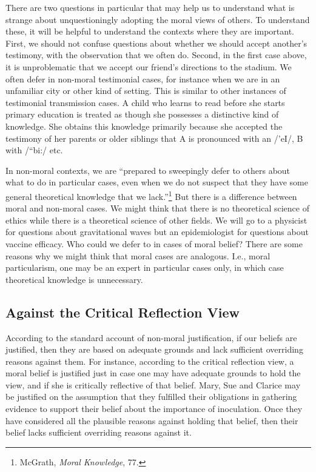 \documentclass[phdthesis,12pt,final]{wuthesis}
\theoremstyle{definition}
\theoremstyle{definition}
\theoremstyle{definition}
\theoremstyle{definition}
\theoremstyle{remark}
\begin{document}
There are two questions in particular that may help us to understand what is strange about unquestioningly adopting the moral views of others. To understand these, it will be helpful to understand the contexts where they are important. First, we should not confuse questions about whether we should accept another's testimony, with the observation that we often do. Second, in the first case above, it is unproblematic that we accept our friend's directions to the stadium. We often defer in non-moral testimonial cases, for instance when we are in an unfamiliar city or other kind of setting. This is similar to other instances of testimonial transmission cases. A child who learns to read before she starts primary education is treated as though she possesses a distinctive kind of knowledge. She obtains this knowledge primarily because she accepted the testimony of her parents or older siblings that A is pronounced with an /'eI/, B with /``bi:/ etc.

In non-moral contexts, we are ``prepared to sweepingly defer to others about what to do in particular cases, even when we do not suspect that they have some general theoretical knowledge that we lack.''\footnote{McGrath, \emph{Moral {Knowledge}}, 77.} But there is a difference between moral and non-moral cases. We might think that there is no theoretical science of ethics while there is a theoretical science of other fields. We will go to a physicist for questions about gravitational waves but an epidemiologist for questions about vaccine efficacy. Who could we defer to in cases of moral belief? There are some reasons why we might think that moral cases are analogous. I.e., moral particularism, one may be an expert in particular cases only, in which case theoretical knowledge is unnecessary.

\subsection*{Against the Critical Reflection View}\label{against-the-critical-reflection-view-1}

According to the standard account of non-moral justification, if our beliefs are justified, then they are based on adequate grounds and lack sufficient overriding reasons against them. For instance, according to the critical reflection view, a moral belief is justified just in case one may have adequate grounds to hold the view, and if she is critically reflective of that belief. Mary, Sue and Clarice may be justified on the assumption that they fulfilled their obligations in gathering evidence to support their belief about the importance of inoculation. Once they have considered all the plausible reasons against holding that belief, then their belief lacks sufficient overriding reasons against it.
\end{document}
